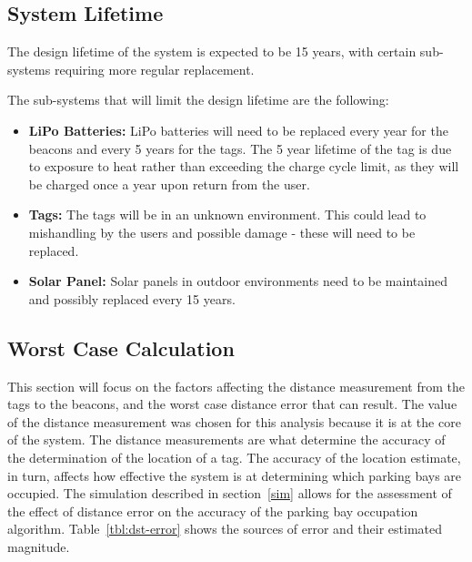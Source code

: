 

\newpage
\subsection{System Lifetime}
The design lifetime of the system is expected to be 15 years, with certain sub-systems requiring more regular replacement. 

The sub-systems that will limit the design lifetime are the following:
\begin{itemize}
\item \textbf{LiPo Batteries:} LiPo batteries will need to be replaced every year for the beacons and every 5 years for the tags. The 5 year lifetime of the tag is due to exposure to heat rather than exceeding the charge cycle limit, as they will be charged once a year upon return from the user. 
\item \textbf{Tags:} The tags will be in an unknown environment. This could lead to mishandling by the users and possible damage - these will need to be replaced.
\item \textbf{Solar Panel:} Solar panels in outdoor environments need to be maintained and possibly replaced every 15 years. 
\end{itemize}

\subsection{Worst Case Calculation}
This section will focus on the factors affecting the distance measurement from the tags to the beacons,
and the worst case distance error that can result. The value of the distance measurement was chosen
for this analysis because it is at the core of the system. The distance measurements are what determine
the accuracy of the determination of the location of a tag. The accuracy of the location estimate, in turn,
affects how effective the system is at determining which parking bays are occupied. The simulation
described in section~\ref{sim} allows for the assessment of the effect of distance error on the accuracy of
the parking bay occupation algorithm. Table~\ref{tbl:dst-error} shows the sources of error and their estimated
magnitude.

